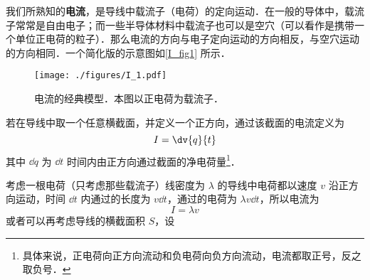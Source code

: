 
\begin{issues}
\issueDraft
\end{issues}


我们所熟知的\textbf{电流}，是导线中载流子（电荷）的定向运动．在一般的导体中，载流子常常是自由电子；而一些半导体材料中载流子也可以是空穴（可以看作是携带一个单位正电荷的粒子）．那么电流的方向与电子定向运动的方向相反，与空穴运动的方向相同．一个简化版的示意图如\autoref{I_fig1} 所示．
\begin{figure}[ht]
\centering
\texttt{[image: ./figures/I\_1.pdf]}
\caption{电流的经典模型．本图以正电荷为载流子．} \label{I_fig1}
\end{figure}

若在导线中取一个任意横截面，并定义一个正方向，通过该截面的电流定义为
\begin{equation}\label{I_eq1}
I = \dv{q}{t}
\end{equation}
其中 $\dd{q}$ 为 $\dd{t}$ 时间内由正方向通过截面的净电荷量\footnote{具体来说，正电荷向正方向流动和负电荷向负方向流动，电流都取正号，反之取负号．}．

考虑一根电荷（只考虑那些载流子）线密度为 $\lambda$ 的导线中电荷都以速度 $v$ 沿正方向运动，时间 $\dd{t}$ 内通过的长度为 $v\dd{t}$，通过的电荷为 $\lambda v\dd{t}$，所以电流为
\begin{equation}
I = \lambda v
\end{equation}
或者可以再考虑导线的横截面积 $S$，设